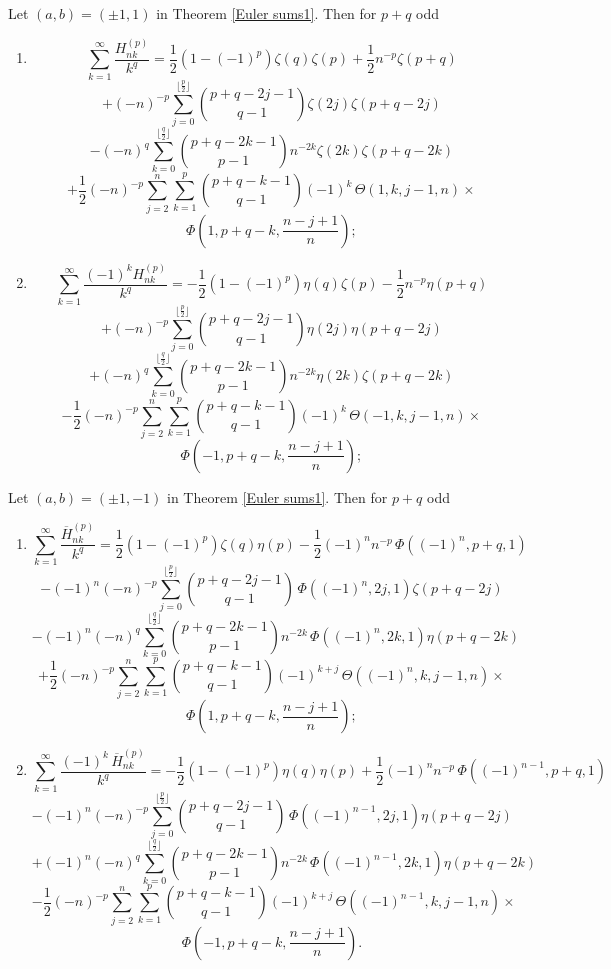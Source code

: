 \documentclass[11pt,reqno]{article}
\begin{document}
\begin{corollary}
	Let $(a,b)=(\pm1,1)$ in Theorem \ref{Euler sums1}. Then for $p+q$ odd
	\begin{enumerate}
		\item[i)]
		\[\sum_{k=1}^\infty\frac{H_{nk}^{(p)}}{k^q}=\frac12(1-{(-1)}^{p})\zeta(q)\zeta(p)+\frac12 n^{-p}\zeta(p+q)\]
		\[+{(-n)}^{-p}\sum_{j=0}^{\lfloor\frac{p}{2}\rfloor}\binom{p+q-2j-1}{q-1}\zeta(2j)\zeta(p+q-2j)\]
		\[-{(-n)}^{q}\sum_{k=0}^{\lfloor\frac{q}{2}\rfloor}\binom{p+q-2k-1}{p-1}n^{-2k}\zeta(2k)\zeta(p+q-2k)\]
		\[+\frac12 {(-n)}^{-p}\sum_{j=2}^{n}\sum_{k=1}^{p}\binom{p+q-k-1}{q-1}{(-1)}^{k}\,\Theta(1,k,j-1,n)\times\]
		\[\Phi\left(1,p+q-k,\frac{n-j+1}{n}\right);\]
		\item[ii)]
		\[\sum_{k=1}^\infty\frac{{(-1)}^{k} H_{nk}^{(p)}}{k^q}=-\frac12(1-{(-1)}^{p})\eta(q)\zeta(p)-\frac12 n^{-p}\eta(p+q)\]
		\[+{(-n)}^{-p}\sum_{j=0}^{\lfloor\frac{p}{2}\rfloor}\binom{p+q-2j-1}{q-1}\eta(2j)\eta(p+q-2j)\]
		\[+{(-n)}^{q}\sum_{k=0}^{\lfloor\frac{q}{2}\rfloor}\binom{p+q-2k-1}{p-1}n^{-2k}\eta(2k)\zeta(p+q-2k)\]
		\[-\frac12 {(-n)}^{-p}\sum_{j=2}^{n}\sum_{k=1}^{p}\binom{p+q-k-1}{q-1}{(-1)}^{k}\,\Theta(-1,k,j-1,n)\times\]
		\[\Phi\left(-1,p+q-k,\frac{n-j+1}{n}\right);\]
		\end{enumerate}
	\end{corollary}
		\begin{corollary}
			Let $(a,b)=(\pm1,-1)$ in Theorem \ref{Euler sums1}. Then for $p+q$ odd
			\begin{enumerate}
		\item[i)]
		\[\sum_{k=1}^\infty\frac{\overline{H}_{nk}^{(p)}}{k^q}=\frac12(1-{(-1)}^{p})\zeta(q)\eta(p)-\frac12 {(-1)}^{n}n^{-p}\,\Phi({(-1)}^{n},p+q,1)\]
		\[-{(-1)}^{n}{(-n)}^{-p}\sum_{j=0}^{\lfloor\frac{p}{2}\rfloor}\binom{p+q-2j-1}{q-1}\,\Phi({(-1)}^{n},2j,1)\zeta(p+q-2j)\]
		\[-{(-1)}^{n} {(-n)}^{q}\sum_{k=0}^{\lfloor\frac{q}{2}\rfloor}\binom{p+q-2k-1}{p-1}n^{-2k}\,\Phi({(-1)}^{n},2k,1)\eta(p+q-2k)\]
		\[+\frac12 {(-n)}^{-p}\sum_{j=2}^{n}\sum_{k=1}^{p}\binom{p+q-k-1}{q-1}{(-1)}^{k+j}\,\Theta({(-1)}^{n},k,j-1,n)\times\]
		\[\Phi\left(1,p+q-k,\frac{n-j+1}{n}\right);\]
		\item[ii)]
		\[\sum_{k=1}^\infty\frac{{(-1)}^{k}\,\overline{H}_{nk}^{(p)}}{k^q}=-\frac12(1-{(-1)}^{p})\eta(q)\eta(p)+\frac12 {(-1)}^{n}n^{-p}\,\Phi({(-1)}^{n-1},p+q,1)\]
		\[-{(-1)}^{n}{(-n)}^{-p}\sum_{j=0}^{\lfloor\frac{p}{2}\rfloor}\binom{p+q-2j-1}{q-1}\,\Phi({(-1)}^{n-1},2j,1)\eta(p+q-2j)\]
		\[+{(-1)}^{n}{(-n)}^{q}\sum_{k=0}^{\lfloor\frac{q}{2}\rfloor}\binom{p+q-2k-1}{p-1}n^{-2k}\,\Phi({(-1)}^{n-1},2k,1)\eta(p+q-2k)\]
		\[-\frac12 {(-n)}^{-p}\sum_{j=2}^{n}\sum_{k=1}^{p}\binom{p+q-k-1}{q-1}{(-1)}^{k+j}\,\Theta({(-1)}^{n-1},k,j-1,n)\times\]
		\[\Phi\left(-1,p+q-k,\frac{n-j+1}{n}\right).\]
	\end{enumerate}
\end{corollary}
\end{document}
